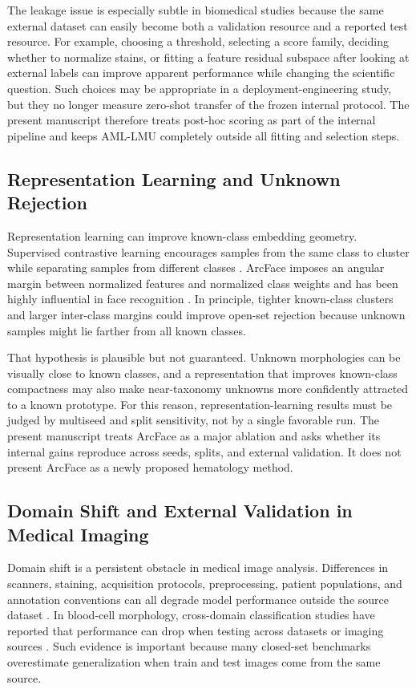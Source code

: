 The leakage issue is especially subtle in biomedical studies because the same external dataset can easily become both a validation resource and a reported test resource. For example, choosing a threshold, selecting a score family, deciding whether to normalize stains, or fitting a feature residual subspace after looking at external labels can improve apparent performance while changing the scientific question. Such choices may be appropriate in a deployment-engineering study, but they no longer measure zero-shot transfer of the frozen internal protocol. The present manuscript therefore treats post-hoc scoring as part of the internal pipeline and keeps AML-LMU completely outside all fitting and selection steps.

\subsection{Representation Learning and Unknown Rejection}

Representation learning can improve known-class embedding geometry. Supervised contrastive learning encourages samples from the same class to cluster while separating samples from different classes \cite{khosla2020_supcon}. ArcFace imposes an angular margin between normalized features and normalized class weights and has been highly influential in face recognition \cite{deng2019_arcface}. In principle, tighter known-class clusters and larger inter-class margins could improve open-set rejection because unknown samples might lie farther from all known classes.

That hypothesis is plausible but not guaranteed. Unknown morphologies can be visually close to known classes, and a representation that improves known-class compactness may also make near-taxonomy unknowns more confidently attracted to a known prototype. For this reason, representation-learning results must be judged by multiseed and split sensitivity, not by a single favorable run. The present manuscript treats ArcFace as a major ablation and asks whether its internal gains reproduce across seeds, splits, and external validation. It does not present ArcFace as a newly proposed hematology method.

\subsection{Domain Shift and External Validation in Medical Imaging}

Domain shift is a persistent obstacle in medical image analysis. Differences in scanners, staining, acquisition protocols, preprocessing, patient populations, and annotation conventions can all degrade model performance outside the source dataset \cite{litjens2017_medical_ai_survey,guan2022_domain_adaptation_medical}. In blood-cell morphology, cross-domain classification studies have reported that performance can drop when testing across datasets or imaging sources \cite{salehi2022_cross_domain,sadafi2024_continual_wbc,tsutsui2023_wbc_domain_shift}. Such evidence is important because many closed-set benchmarks overestimate generalization when train and test images come from the same source.

